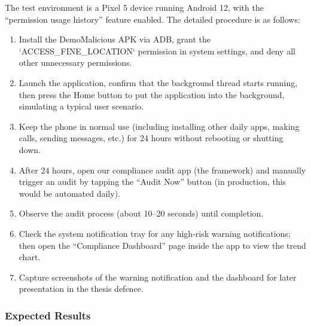 The test environment is a Pixel 5 device running Android 12, with the “permission usage history” feature enabled. The detailed procedure is as follows:
\begin{enumerate}
    \item Install the DemoMalicious APK via ADB, grant the `ACCESS\_FINE\_LOCATION` permission in system settings, and deny all other unnecessary permissions.
    \item Launch the application, confirm that the background thread starts running, then press the Home button to put the application into the background, simulating a typical user scenario.
    \item Keep the phone in normal use (including installing other daily apps, making calls, sending messages, etc.) for 24 hours without rebooting or shutting down.
    \item After 24 hours, open our compliance audit app (the framework) and manually trigger an audit by tapping the “Audit Now” button (in production, this would be automated daily).
    \item Observe the audit process (about 10–20 seconds) until completion.
    \item Check the system notification tray for any high‑risk warning notifications; then open the “Compliance Dashboard” page inside the app to view the trend chart.
    \item Capture screenshots of the warning notification and the dashboard for later presentation in the thesis defence.
\end{enumerate}

\subsubsection{Expected Results}

